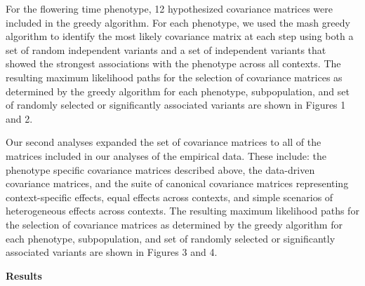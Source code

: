 \documentclass[
  letterpaper,
  DIV=11,
  numbers=noendperiod]{scrartcl}
\begin{document}
\hfill\break

For the flowering time phenotype, 12 hypothesized covariance matrices
were included in the greedy algorithm. For each phenotype, we used the
mash greedy algorithm to identify the most likely covariance matrix at
each step using both a set of random independent variants and a set of
independent variants that showed the strongest associations with the
phenotype across all contexts. The resulting maximum likelihood paths
for the selection of covariance matrices as determined by the greedy
algorithm for each phenotype, subpopulation, and set of randomly
selected or significantly associated variants are shown in Figures 1 and
2.~

\hfill\break

Our second analyses expanded the set of covariance matrices to all of
the matrices included in our analyses of the empirical data. These
include: the phenotype specific covariance matrices described above, the
data-driven covariance matrices, and the suite of canonical covariance
matrices representing context-specific effects, equal effects across
contexts, and simple scenarios of heterogeneous effects across contexts.
The resulting maximum likelihood paths for the selection of covariance
matrices as determined by the greedy algorithm for each phenotype,
subpopulation, and set of randomly selected or significantly associated
variants are shown in Figures 3 and 4.~

\hfill\break

\textbf{Results}
\end{document}
